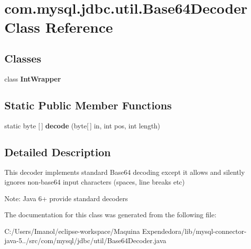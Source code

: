 \hypertarget{classcom_1_1mysql_1_1jdbc_1_1util_1_1_base64_decoder}{}\section{com.\+mysql.\+jdbc.\+util.\+Base64\+Decoder Class Reference}
\label{classcom_1_1mysql_1_1jdbc_1_1util_1_1_base64_decoder}
\subsection*{Classes}
\begin{DoxyCompactItemize}
\item 
class {\bfseries Int\+Wrapper}
\end{DoxyCompactItemize}
\subsection*{Static Public Member Functions}
\begin{DoxyCompactItemize}
\item 
\mbox{\label{classcom_1_1mysql_1_1jdbc_1_1util_1_1_base64_decoder_a61ee637cf7375b410dcc9c9a0a6e3092}} 
static byte \mbox{[}$\,$\mbox{]} {\bfseries decode} (byte\mbox{[}$\,$\mbox{]} in, int pos, int length)
\end{DoxyCompactItemize}


\subsection{Detailed Description}
This decoder implements standard Base64 decoding except it allows and silently ignores non-\/base64 input characters (spaces, line breaks etc)

Note\+: Java 6+ provide standard decoders 

The documentation for this class was generated from the following file\+:\begin{DoxyCompactItemize}
\item 
C\+:/\+Users/\+Imanol/eclipse-\/workspace/\+Maquina Expendedora/lib/mysql-\/connector-\/java-\/5../src/com/mysql/jdbc/util/Base64\+Decoder.\+java\end{DoxyCompactItemize}
